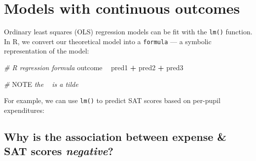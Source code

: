 \documentclass[
]{book}
\newenvironment{Shaded}{\begin{snugshade}}{\end{snugshade}}
\newcommand{\AlertTok}[1]{\textcolor[rgb]{0.94,0.16,0.16}{#1}}
\newcommand{\CommentTok}[1]{\textcolor[rgb]{0.56,0.35,0.01}{\textit{#1}}}
\newcommand{\DataTypeTok}[1]{\textcolor[rgb]{0.13,0.29,0.53}{#1}}
\newcommand{\DecValTok}[1]{\textcolor[rgb]{0.00,0.00,0.81}{#1}}
\newcommand{\KeywordTok}[1]{\textcolor[rgb]{0.13,0.29,0.53}{\textbf{#1}}}
\newcommand{\NormalTok}[1]{#1}
\newcommand{\OperatorTok}[1]{\textcolor[rgb]{0.81,0.36,0.00}{\textbf{#1}}}
\newcommand{\StringTok}[1]{\textcolor[rgb]{0.31,0.60,0.02}{#1}}
\begin{document}
\hypertarget{models-with-continuous-outcomes}{%
\section{Models with continuous outcomes}\label{models-with-continuous-outcomes}}

Ordinary least squares (OLS) regression models can be fit with the \texttt{lm()} function.
In R, we convert our theoretical model into a \texttt{formula} --- a symbolic representation of the model:

\begin{Shaded}
\begin{Highlighting}[]
\CommentTok{# R regression formula}
\NormalTok{outcome }\OperatorTok{~}\StringTok{ }\NormalTok{pred1 }\OperatorTok{+}\StringTok{ }\NormalTok{pred2 }\OperatorTok{+}\StringTok{ }\NormalTok{pred3}

\CommentTok{# }\AlertTok{NOTE}\CommentTok{ the ~ is a tilde}
\end{Highlighting}
\end{Shaded}

For example, we can use \texttt{lm()} to predict SAT scores based on per-pupil expenditures:

\begin{Shaded}
\end{Shaded}

\hypertarget{why-is-the-association-between-expense-sat-scores-negative}{%
\subsection{\texorpdfstring{Why is the association between expense \& SAT scores \emph{negative}?}{Why is the association between expense \& SAT scores negative?}}\label{why-is-the-association-between-expense-sat-scores-negative}}
\end{document}

